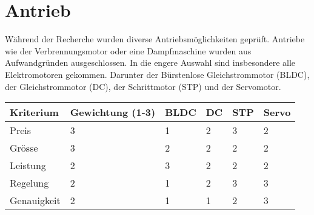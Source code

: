 \section{Antrieb}

Während der Recherche wurden diverse Antriebsmöglichkeiten geprüft.
Antriebe wie der Verbrennungsmotor oder eine Dampfmaschine wurden aus Aufwandgründen ausgeschlossen.
In die engere Auswahl sind insbesondere alle Elektromotoren gekommen.
Darunter der Bürstenlose Gleichstrommotor (BLDC), der Gleichstrommotor (DC), der Schrittmotor (STP) und der Servomotor.


\begin{table}[h]
\begin{tabular}{|p{4.5cm}|p{3.5cm}|p{1.25cm}|p{1.25cm}|p{1.25cm}|p{1.25cm}|}\hline
	
	\textbf{Kriterium}	& 	\textbf{Gewichtung (1-3)} & \textbf{BLDC} & \textbf{DC} & \textbf{STP}& \textbf{Servo}\\\hline
	{Preis}	& 	{3} & {1} & {2} & {3}& {2}\\\hline
	{Grösse}	& 	{3} & {2} & {2} & {2}& {2}\\\hline
	{Leistung}	& 	{2} & {3} & {2} & {2}& {2}\\\hline
	{Regelung}	& 	{2} & {1} & {2} & {3}& {3}\\\hline
	{Genauigkeit}	& 	{2} & {1} & {1} & {2}& {3}\\\hline
	
	
	
	
\end{tabular}\\
\end{table}